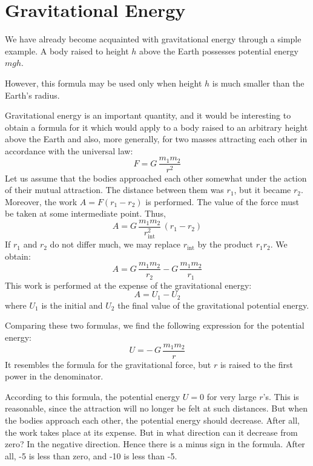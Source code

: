 \section{Gravitational Energy}

We have already become acquainted with gravitational
energy through a simple example. A body raised to
height $h$ above the Earth possesses potential energy $mgh$.

However, this formula may be used only when height
$h$ is much smaller than the Earth's radius.

Gravitational energy is an important quantity, and
it would be interesting to obtain a formula for it which
would apply to a body raised to an arbitrary height above
the Earth and also, more generally, for two masses
attracting each other in accordance with the universal
law:
 \begin{equation*}%
F  = G\, \dfrac{m_{1}m_{2}}{r^{2}} 
 \end{equation*}
Let us assume that the bodies approached each other
somewhat under the action of their mutual attraction.
The distance between them was $r_{1}$, but it became $r_{2}$.
Moreover, the work $ A = F (r_{1} - r_{2} )$ is performed. The
value of the force must be taken at some intermediate
point. Thus,
 \begin{equation*}%
A =  G \,  \dfrac{m_{1}m_{2}}{r_{\textrm{int}}^{2}} \, (r_{1} - r_{2} )
 \end{equation*}
 If $r_{1}$ and $r_{2}$ do not differ much, we may replace $r_{\textrm{int}}$ by the
product $r_{1}r_{2}$. We obtain:
 \begin{equation*}%
A =  G \, \dfrac{m_{1}m_{2}}{r_{2}} -  G  \, \dfrac{m_{1}m_{2}}{r_{1}}
 \end{equation*}
This work is performed at the expense of the gravitational
energy:
 \begin{equation*}%
A =  U_{1} - U_{2}
 \end{equation*}
where $U_{1}$ is the initial and $U_{2}$ the final value of the
gravitational potential energy.

Comparing these two formulas, we find the following
expression for the potential energy:
 \begin{equation*}%
U = - \, G \,  \dfrac{m_{1}m_{2}}{r}
 \end{equation*}
It resembles the formula for the gravitational force,
but $r$ is raised to the first power in the denominator.

According to this formula, the potential energy $U = 0$
for very large $r$'s. This is reasonable, since the attraction
will no longer be felt at such distances. But when the
bodies approach each other, the potential energy should
decrease. After all, the work takes place at its expense.
But in what direction can it decrease from zero? In the
negative direction. Hence there is a minus sign in the
formula. After all, -5 is less than zero, and -10 is less
than -5.

